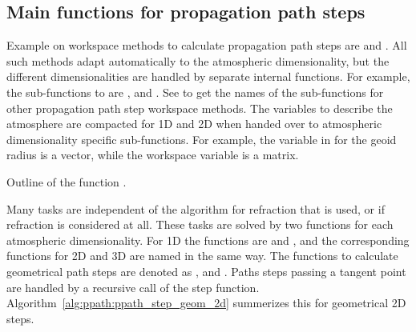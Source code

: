 \subsection{Main functions for propagation path steps}

Example on workspace methods to calculate propagation path steps are
 and
. All such methods adapt
automatically to the atmospheric dimensionality, but the different
dimensionalities are handled by separate internal functions. For
example, the sub-functions to  are
, 
and . See  to
get the names of the sub-functions for other propagation path step
workspace methods. The variables to describe the atmosphere are
compacted for 1D and 2D when handed over to atmospheric dimensionality
specific sub-functions. For example, the variable in
 for the geoid radius is a vector,
while the workspace variable is a matrix.

\begin{algorithm}[!t]
 \begin{algorithmic}
  \ENDIF
  \ENDIF
 \end{algorithmic}
 \caption{Outline of the function .}
 \label{alg:ppath:ppath_step_geom_2d}
\end{algorithm}

Many tasks are independent of the algorithm for refraction that is
used, or if refraction is considered at all. These tasks are solved by
two functions for each atmospheric dimensionality. For 1D the
functions are  and
, and the corresponding functions for 2D and
3D are named in the same way. The functions to calculate geometrical
path steps are denoted as ,
 and . Paths
steps passing a tangent point are handled by a recursive call of the
step function. Algorithm~\ref{alg:ppath:ppath_step_geom_2d} summerizes
this for geometrical 2D steps.


